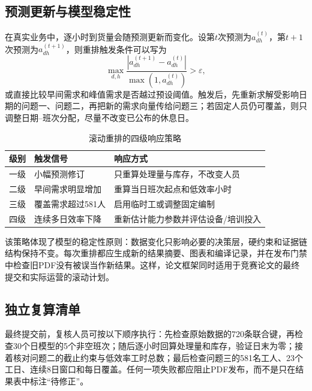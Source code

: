 \subsection{预测更新与模型稳定性}

在真实业务中，逐小时到货量会随预测更新而变化。设第$t$次预测为$a^{(t)}_{dh}$，第$t+1$次预测为$a^{(t+1)}_{dh}$，则重排触发条件可以写为
\begin{equation}
 \max_{d,h}\frac{|a^{(t+1)}_{dh}-a^{(t)}_{dh}|}{\max(1,a^{(t)}_{dh})}>\varepsilon,
\end{equation}
或直接比较早间需求和峰值需求是否越过预设阈值。触发后，先重新求解受影响日期的问题一、问题二，再把新的需求向量传给问题三；若固定人员仍可覆盖，则只调整日期--班次分配，尽量不改变已公布的休息日。

\begin{table}[htbp]
\centering
\caption{滚动重排的四级响应策略}
\label{tab:rolling}
\begin{tabular}{p{}p{}p{}}
\toprule
级别 & 触发信号 & 响应方式\\
\midrule
一级 & 小幅预测修订 & 只重算处理量与库存，不改变人员\\
二级 & 早间需求明显增加 & 重算当日班次起点和低效率小时\\
三级 & 覆盖需求超过581人 & 启用临时工或调整固定编制\\
四级 & 连续多日效率下降 & 重新估计能力参数并评估设备/培训投入\\
\bottomrule
\end{tabular}
\end{table}

该策略体现了模型的稳定性原则：数据变化只影响必要的决策层，硬约束和证据链结构保持不变。每次重排都应生成新的结果摘要、图表和编译记录，并在发布门禁中检查旧PDF没有被误当作新结果。这样，论文框架同时适用于竞赛论文的最终提交和实际运营的滚动计划。

\subsection{独立复算清单}

最终提交前，复核人员可按以下顺序执行：先检查原始数据的720条联合键，再检查30个日模型的5个非空班次；随后逐小时回算处理量和库存，验证日末为零；接着核对问题二的截止约束与低效率工时总数；最后检查问题三的581名工人、23个工日、连续8日窗口和每日覆盖。任何一项失败都应阻止PDF发布，而不是只在结果表中标注“待修正”。

